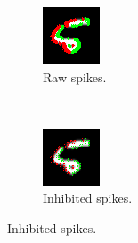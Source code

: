 \documentclass[conference]{IEEEtran}
\begin{document}
\setcounter{figure}{11} %
\begin{figure}[htb]
  \captionsetup[subfigure]{justification=centering}
  \centering
  \begin{subfigure}[b]{0.21\textwidth}
    \includegraphics[width=\textwidth]{pre_inh_frame_262}
    \caption{Raw spikes.}
    \label{fig:pre_inh}
  \end{subfigure}
  ~
  \begin{subfigure}[b]{0.21\textwidth}
    \includegraphics[width=\textwidth]{post_inh_frame_262}
    \caption{Inhibited spikes.}
    \label{fig:post_inh}
  \end{subfigure}


\end{figure}
\end{document}
